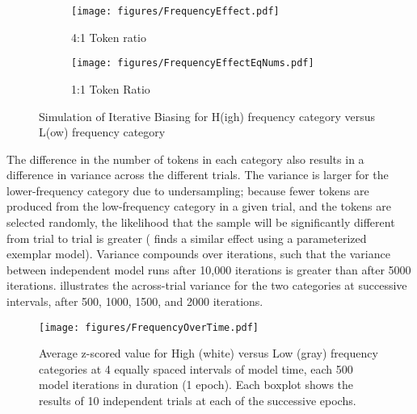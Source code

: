 \begin{figure}[H]
\begin{subfigure}[t]{.45\textwidth}
        \texttt{[image: figures/FrequencyEffect.pdf]}
        \caption{\label{fig:HvL}4:1 Token ratio}
    \end{subfigure}\hfill
    \begin{subfigure}[t]{.45\textwidth}
        \texttt{[image: figures/FrequencyEffectEqNums.pdf]}
        \caption{\label{fig:Freq.EqualTokens}1:1 Token Ratio}
    \end{subfigure}
\caption{Simulation of Iterative Biasing for H(igh) frequency category versus
L(ow) frequency category}
\end{figure}

The difference in the number of tokens in each category also results
in a difference in variance across the different trials. The variance
is larger for the lower-frequency category due to undersampling; because
fewer tokens are produced from the low-frequency category in a given
trial, and the tokens are selected randomly, the likelihood that the
sample will be significantly different from trial to trial is greater
(\citealt{Soskuthy} finds a similar effect using a parameterized exemplar
model). Variance compounds over iterations, such that the variance
between independent model runs after 10,000 iterations is greater
than after 5000 iterations.  illustrates
the across-trial variance for the two categories at successive intervals,
after 500, 1000, 1500, and 2000 iterations.

\begin{figure}[H]
\centering{}\texttt{[image: figures/FrequencyOverTime.pdf]}\caption{\label{fig:Frequency Catch Up}Average z-scored value for High (white)
versus Low (gray) frequency categories at 4 equally spaced intervals
of model time, each 500 model iterations in duration (1 epoch). Each boxplot shows
the results of 10 independent trials at each of the successive epochs.}
\end{figure}


